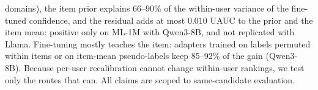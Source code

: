 domains), the item prior explains 66--90\% of the within-user variance of the fine-tuned confidence, and the residual adds at most 0.010 UAUC to
the prior and the item mean: positive only on ML-1M with Qwen3-8B, and not replicated with Llama. Fine-tuning mostly teaches the
item: adapters trained on labels permuted within items or on item-mean pseudo-labels keep 85--92\% of the gain (Qwen3-8B).
Because per-user recalibration cannot change within-user rankings, we test only the routes that can. All claims are scoped to
same-candidate evaluation.
